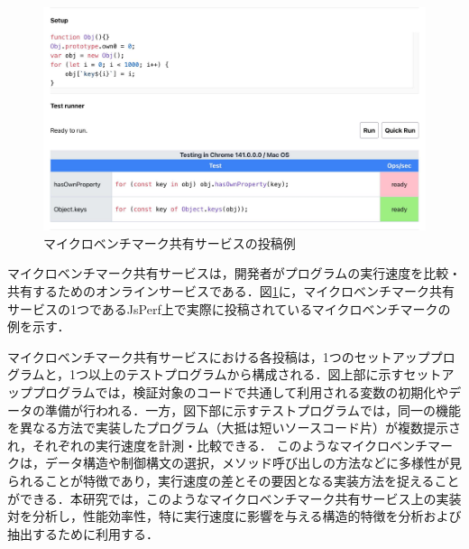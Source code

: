 \documentclass[submit,techrep,noauthor]{ipsj}
\newcommand{\todo}[1]{\colorbox{yellow}{{\bf TODO}:}{\color{red} {\textbf{[#1]}}}}
\begin{document}
\begin{figure}[t]
    \centering
    \includegraphics[width=1.0\linewidth]{./Noguchi_fig/jsPerf_example.pdf}
    \caption{マイクロベンチマーク共有サービスの投稿例\protect\footnotemark}
    \label{fig:jsPerf}
\end{figure}


マイクロベンチマーク共有サービスは，開発者がプログラムの実行速度を比較・共有するためのオンラインサービスである．図\ref{fig:jsPerf}に，マイクロベンチマーク共有サービスの1つであるJsPerf上で実際に投稿されているマイクロベンチマークの例を示す．

マイクロベンチマーク共有サービスにおける各投稿は，1つのセットアッププログラムと，1つ以上のテストプログラムから構成される．図上部に示すセットアッププログラムでは，検証対象のコードで共通して利用される変数の初期化やデータの準備が行われる．一方，図下部に示すテストプログラムでは，同一の機能を異なる方法で実装したプログラム（大抵は短いソースコード片）が複数提示され，それぞれの実行速度を計測・比較できる．
このようなマイクロベンチマークは，データ構造や制御構文の選択，メソッド呼び出しの方法などに多様性が見られることが特徴であり，実行速度の差とその要因となる実装方法を捉えることができる．本研究では，このようなマイクロベンチマーク共有サービス上の実装対を分析し，性能効率性，特に実行速度に影響を与える構造的特徴を分析および抽出するために利用する．


\end{document}
